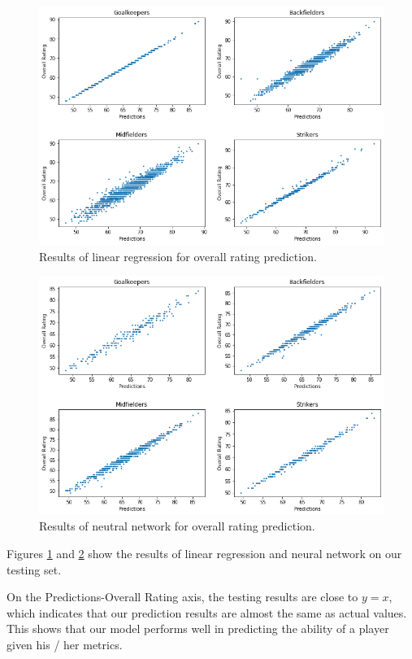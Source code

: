 \documentclass{article}
\begin{document}
\begin{figure}[!htb]
	\centering
    \includegraphics[scale=0.45]{linear.png}
    \caption{Results of linear regression for overall rating prediction.}\label{fig3}
\end{figure}

\begin{figure}[!htb]
	\centering
    \includegraphics[scale=0.45]{nn.png}
    \caption{Results of neutral network for overall rating prediction.}\label{fig4}
\end{figure}

Figures \ref{fig3} and \ref{fig4} show the results of linear regression and neural network on our testing set.

On the Predictions-Overall Rating axis, the testing results are close to $y=x$, which indicates that our prediction results are almost the same as actual values. This shows that our model performs well in predicting the ability of a player given his / her metrics. 
\end{document}
